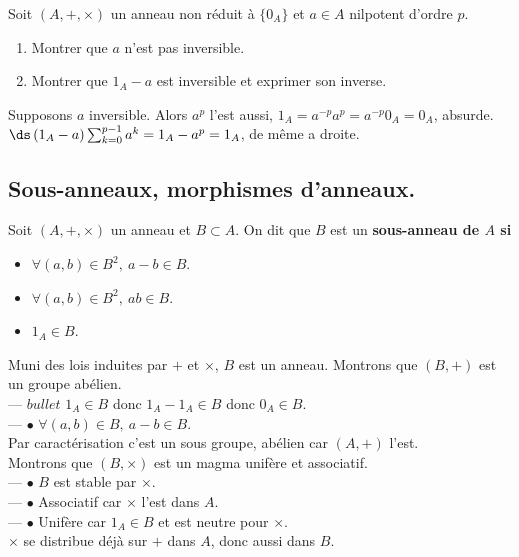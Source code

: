 \documentclass[11pt]{article}
\begin{document}
\begin{ex}{}{}
    Soit $(A,+,\times)$ un anneau non réduit à $\{0_A\}$ et $a\in A$ nilpotent d'ordre $p$.
    \begin{enumerate}
        \item Montrer que $a$ n'est pas inversible.
        \item Montrer que $1_A-a$ est inversible et exprimer son inverse.
    \end{enumerate}
    \tcblower
     Supposons $a$ inversible. Alors $a^p$ l'est aussi, $1_A=a^{-p}a^p=a^{-p}0_A=0_A$, absurde.\\
     $\ds\left( 1_A-a \right)\sum_{k=0}^{p-1}a^k=1_A-a^p=1_A$, de même a droite.
\end{ex}

\subsection{Sous-anneaux, morphismes d'anneaux.}

\begin{prop}{}{}
    Soit $(A,+,\times)$ un anneau et $B\subset A$. On dit que $B$ est un \bf{sous-anneau} de $A$ si
    \begin{itemize}
        \item $\forall (a,b)\in B^2, ~ a-b\in B$.
        \item $\forall (a,b)\in B^2, ~ ab \in B$.
        \item $1_A\in B$.
    \end{itemize}
    Muni des lois induites par $+$ et $\times$, $B$ est un anneau.
    \tcblower
    Montrons que $(B,+)$ est un groupe abélien.\\
    --- $bullet$ $1_A\in B$ donc $1_A-1_A\in B$ donc $0_A\in B$.\\
    --- $\bullet$ $\forall (a,b)\in B, ~ a-b \in B$.\\
    Par caractérisation c'est un sous groupe, abélien car $(A,+)$ l'est.\\
    Montrons que $(B,\times)$ est un magma unifère et associatif.\\
    --- $\bullet$ $B$ est stable par $\times$.\\
    --- $\bullet$ Associatif car $\times$ l'est dans $A$.\\
    --- $\bullet$ Unifère car $1_A\in B$ et est neutre pour $\times$.\\
    $\times$ se distribue déjà sur $+$ dans $A$, donc aussi dans $B$.
\end{prop}
\end{document}
